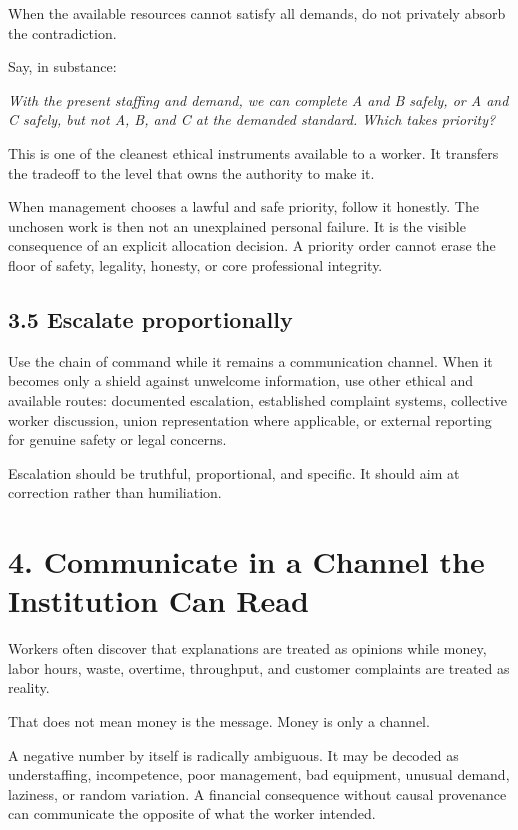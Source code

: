 \documentclass[11pt,oneside]{article}
\renewenvironment{quote}
  {\begin{tcolorbox}[
      enhanced,
      breakable,
      colback=ManifestLight,
      colframe=ManifestRule,
      boxrule=0pt,
      leftrule=3pt,
      arc=0pt,
      outer arc=0pt,
      left=10pt,right=10pt,top=8pt,bottom=8pt,
      before skip=0.8em,after skip=0.8em
    ]\itshape}
  {\end{tcolorbox}}
\begin{document}
When the available resources cannot satisfy all demands, do not
privately absorb the contradiction.

Say, in substance:

\begin{quote}
With the present staffing and demand, we can complete A and B safely, or
A and C safely, but not A, B, and C at the demanded standard. Which
takes priority?
\end{quote}

This is one of the cleanest ethical instruments available to a worker.
It transfers the tradeoff to the level that owns the authority to make
it.

When management chooses a lawful and safe priority, follow it honestly.
The unchosen work is then not an unexplained personal failure. It is the
visible consequence of an explicit allocation decision. A priority order
cannot erase the floor of safety, legality, honesty, or core
professional integrity.

\hypertarget{escalate-proportionally}{%
\subsection{3.5 Escalate proportionally}\label{escalate-proportionally}}

Use the chain of command while it remains a communication channel. When
it becomes only a shield against unwelcome information, use other
ethical and available routes: documented escalation, established
complaint systems, collective worker discussion, union representation
where applicable, or external reporting for genuine safety or legal
concerns.

Escalation should be truthful, proportional, and specific. It should aim
at correction rather than humiliation.

\hypertarget{communicate-in-a-channel-the-institution-can-read}{%
\section{4. Communicate in a Channel the Institution Can
Read}\label{communicate-in-a-channel-the-institution-can-read}}

Workers often discover that explanations are treated as opinions while
money, labor hours, waste, overtime, throughput, and customer complaints
are treated as reality.

That does not mean money is the message. Money is only a channel.

A negative number by itself is radically ambiguous. It may be decoded as
understaffing, incompetence, poor management, bad equipment, unusual
demand, laziness, or random variation. A financial consequence without
causal provenance can communicate the opposite of what the worker
intended.
\end{document}
